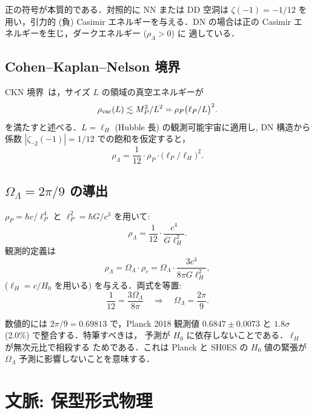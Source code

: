 \documentclass[11pt,a4paper]{article}
\begin{document}
正の符号が本質的である．対照的に NN または DD 空洞は $\zeta(-1) = -1/12$
を用い，引力的 (負) Casimir エネルギーを与える．DN の場合は正の
Casimir エネルギーを生じ，ダークエネルギー ($\rho_\Lambda > 0$) に
適している．

\subsection{Cohen--Kaplan--Nelson 境界}

CKN 境界~\cite{CKN1999}は，サイズ $L$ の領域の真空エネルギーが
\begin{equation}
\rho_{\rm vac}(L) \lesssim M_P^2/L^2 = \rho_P\bigl(\ell_P/L\bigr)^2.
\end{equation}
を満たすと述べる．$L = \ell_H$ (Hubble 長) の観測可能宇宙に適用し,
DN 構造から係数 $|\zeta_{\neg 2}(-1)| = 1/12$ での飽和を仮定すると，
\begin{equation}
\rho_\Lambda = \frac{1}{12}\cdot\rho_P\cdot\bigl(\ell_P/\ell_H\bigr)^2.
\end{equation}

\subsection{$\Omega_\Lambda = 2\pi/9$ の導出}

$\rho_P = \hbar c/\ell_P^4$ と $\ell_P^2 = \hbar G/c^3$ を用いて:
\begin{equation}
\rho_\Lambda = \frac{1}{12}\cdot\frac{c^4}{G\ell_H^2}.
\end{equation}
観測的定義は
\begin{equation}
\rho_\Lambda = \Omega_\Lambda\cdot\rho_c = \Omega_\Lambda\cdot\frac{3c^4}{8\pi G\ell_H^2},
\end{equation}
($\ell_H = c/H_0$ を用いる) を与える．両式を等置:
\begin{equation}
\frac{1}{12} = \frac{3\Omega_\Lambda}{8\pi}
\quad\Longrightarrow\quad
\boxed{\Omega_\Lambda = \frac{2\pi}{9}}.
\end{equation}

数値的には $2\pi/9 = 0.69813$ で，Planck 2018 観測値
$0.6847 \pm 0.0073$ と $1.8\sigma$ (2.0\%) で整合する．特筆すべきは，
予測が $H_0$ に依存しないことである．$\ell_H$ が無次元比で相殺する
ためである．これは Planck と SH0ES の $H_0$ 値の緊張が $\Omega_\Lambda$
予測に影響しないことを意味する．

\section{文脈: 保型形式物理}
\label{sec:context}
\end{document}

